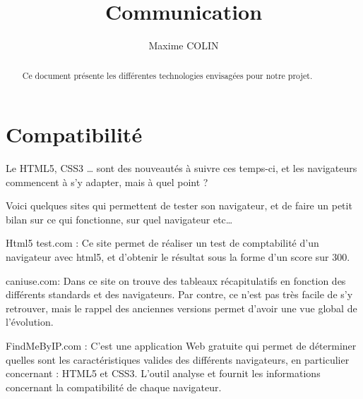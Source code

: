 \documentclass[a4paper,10pt]{report}
\title{Communication}
\author{Maxime COLIN}
\begin{document}
\maketitle

\begin{abstract}
Ce document présente les différentes technologies envisagées pour notre projet.
\end{abstract}


\chapter{Compatibilité}
Le HTML5, CSS3 …  sont des nouveautés à suivre ces temps-ci, et les navigateurs commencent à s’y adapter, mais à quel point ?

Voici quelques sites qui permettent de tester son navigateur, et de faire un petit bilan sur ce qui fonctionne, sur quel navigateur etc…

Html5 test.com : Ce site permet de réaliser un test de comptabilité d’un navigateur avec html5, et d’obtenir le résultat sous la forme d’un score sur 300.

caniuse.com: Dans ce site on trouve des tableaux récapitulatifs en fonction des différents standards et des navigateurs. Par contre, ce n’est pas très facile de s’y retrouver, mais le rappel des anciennes versions permet d’avoir une vue global de l’évolution.

FindMeByIP.com : C’est une application Web gratuite qui permet de déterminer quelles sont les caractéristiques valides des différents navigateurs, en particulier concernant : HTML5 et CSS3. L’outil analyse et fournit les informations concernant la compatibilité de chaque navigateur.
\end{document}
